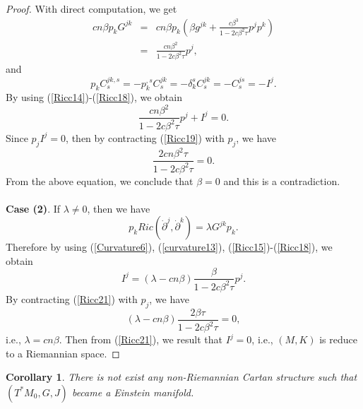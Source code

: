 \documentclass[10pt,a4paper]{article}
\theoremstyle{plain}
\newtheorem{cor}[theorem]{Corollary}
\theoremstyle{definition}
\begin{document}
\begin{proof}
With direct computation, we get
\begin{eqnarray}
\nonumber cn\beta p_kG^{jk}\!\!\!\!&=&\!\!\!\!cn\beta p_k(\beta
g^{jk}+\frac{c\beta^3}{1-2c\beta^2\tau}p^jp^k)\\
\!\!\!\!&=&\!\!\!\!\frac{cn\beta^2}{1-2c\beta^2\tau}p^j,\label{Ricc17}
\end{eqnarray}
and
\begin{equation}
p_kC^{jk,s}_s=-p^{,s}_kC^{jk}_s=-\delta^s_kC^{jk}_s=-C^{js}_s=-I^j.\label{Ricc18}
\end{equation}
By using (\ref{Ricc14})-(\ref{Ricc18}), we obtain
\begin{equation}
\frac{cn\beta^2}{1-2c\beta^2\tau}p^j+I^j=0.\label{Ricc19}
\end{equation}
Since $p_jI^j=0$, then by contracting (\ref{Ricc19}) with $p_j$, we have
\begin{equation}
\frac{2cn\beta^2\tau}{1-2c\beta^2\tau}=0.\label{Ricc20}
\end{equation}
From the above equation,  we conclude that $\beta=0$ and this is a contradiction.\\\\
\textbf{Case (2)}. If $\lambda\neq0$, then we have
\[
p_kRic({\dot{\partial}}^j,{\dot{\partial}}^k)=\lambda G^{jk}p_k.
\]
Therefore by using (\ref{Curvature6}), (\ref{curvature13}),
(\ref{Ricc15})-(\ref{Ricc18}), we obtain
\begin{equation}
I^j=(\lambda-cn\beta)\frac{\beta}{1-2c\beta^2\tau}p^j.\label{Ricc21}
\end{equation}
By contracting (\ref{Ricc21}) with $p_j$, we have
\begin{equation}
(\lambda-cn\beta)\frac{2\beta\tau}{1-2c\beta^2\tau}=0,\label{Ricc22}
\end{equation}
i.e., $\lambda=cn\beta$. Then from (\ref{Ricc21}), we result that
$I^j=0$, i.e., $(M,K)$ is reduce to a Riemannian space.
\end{proof}
\begin{cor}
There is not exist any non-Riemannian Cartan structure such that
$(T^{\ast}M_0, G, J)$ became a Einstein manifold.
\end{cor}

\bigskip
\end{document}
